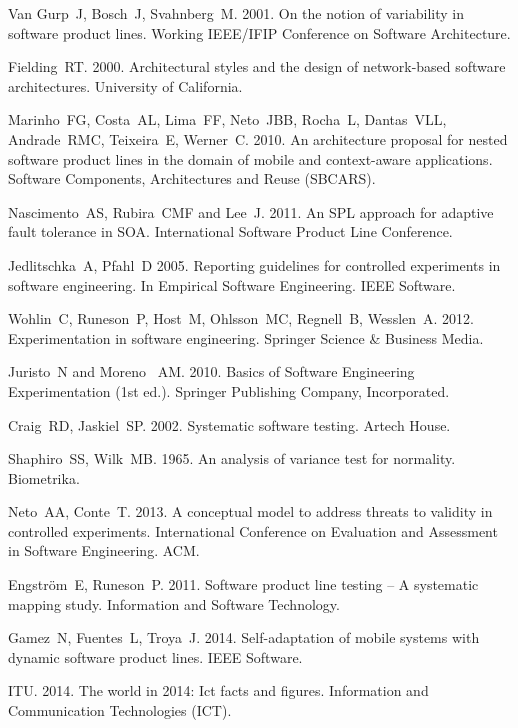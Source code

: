 \documentclass{kais}
\begin{document}
\begin{thebibliography}{99}
 Van Gurp~J, Bosch~J, Svahnberg~M. 2001. On the notion of variability in software product lines. Working IEEE/IFIP Conference on Software Architecture.

 Fielding~RT. 2000. Architectural styles and the design of network-based software architectures. University of California.

 Marinho~FG, Costa~AL, Lima~FF, Neto~JBB, Rocha~L, Dantas~VLL, Andrade~RMC, Teixeira~E, Werner~C. 2010. An architecture proposal for nested software product lines in the domain of mobile and context-aware applications. Software Components, Architectures and Reuse (SBCARS).

 Nascimento~AS, Rubira~CMF and Lee~J. 2011. An SPL approach for adaptive fault tolerance in SOA. International Software Product Line Conference.

 Jedlitschka~A, Pfahl~D 2005. Reporting guidelines for controlled experiments in software engineering. In Empirical Software Engineering. IEEE Software.

 Wohlin~C, Runeson~P, Host~M, Ohlsson~MC, Regnell~B, Wesslen~A. 2012. Experimentation in software engineering. Springer Science \& Business Media.

 Juristo~N and Moreno~ AM. 2010. Basics of Software Engineering Experimentation (1st ed.). Springer Publishing Company, Incorporated.

 Craig~RD, Jaskiel~SP. 2002. Systematic software testing. Artech House.

 Shaphiro~SS, Wilk~MB. 1965. An analysis of variance test for normality. Biometrika.

 Neto~AA, Conte~T. 2013. A conceptual model to address threats to validity in controlled experiments. International Conference on Evaluation and Assessment in Software Engineering. ACM.

 Engstr\"{o}m~E, Runeson~P. 2011. Software product line testing -- A systematic mapping study. Information and Software Technology.

 Gamez~N, Fuentes~L, Troya~J. 2014. Self-adaptation of mobile systems with dynamic software product lines. IEEE Software.

 ITU. 2014. The world in 2014: Ict facts and figures. Information and Communication Technologies (ICT).

\end{thebibliography}
\end{document}
